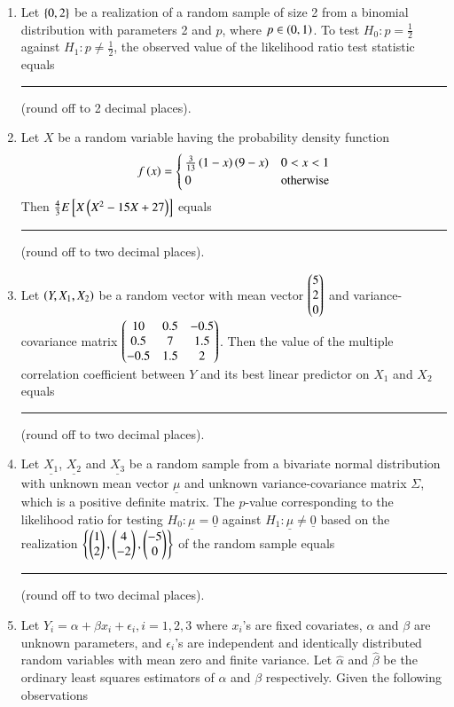 \documentclass[journal]{IEEEtran}
\begin{document}
\begin{enumerate}
    \item Let $\left\{0, 2\right\}$ be a realization of a random sample of size 2 from a binomial distribution
    with parameters 2 and $p$, where $p \in \left(0, 1\right)$. To test $H_0: p = \frac{1}{2}$ against
    $H_1: p \ne \frac{1}{2}$, the observed value of the likelihood ratio test statistic equals
    \rule{1.0cm}{0.15mm} (round off to 2 decimal places).

    \item Let $X$ be a random variable having the probability density function
    \begin{align*}
        f\left(x\right) = 
        \begin{cases}
            \frac{3}{13}\left(1-x\right)\left(9-x\right) & 0 < x < 1 \\
            0 & \text{otherwise}
        \end{cases}
    \end{align*}
    Then $\frac{4}{3}E{}\left[X\left(X^2 - 15X + 27\right)\right]$ equals \rule{1.0cm}{0.15mm}
    (round off to two decimal places).

    \item Let $\left(Y, X_1, X_2\right)$ be a random vector with mean vector $\begin{pmatrix}5 \\ 2 \\ 0\end{pmatrix}$ and
    variance-covariance matrix $\begin{pmatrix}10 & 0.5 & -0.5 \\ 0.5 & 7 & 1.5 \\ -0.5 & 1.5 & 2\end{pmatrix}$.
    Then the value of the multiple correlation coefficient between $Y$ and its best linear predictor on $X_1$
    and $X_2$ equals \rule{1.0cm}{0.15mm} (round off to two decimal places).

    \item Let $\underline{X_1}$, $\underline{X_2}$ and $\underline{X_3}$ be a random sample from a bivariate
    normal distribution with unknown mean vector $\underline{\mu}$ and unknown variance-covariance matrix
    $\Sigma$, which is a positive definite matrix. The $p$-value corresponding to the likelihood ratio for testing
    $H_0: \underline{\mu} = \underline{0}$ against $H_1: \underline{\mu} \ne \underline{0}$ based on the realization
    $\left\{\begin{pmatrix}1 \\ 2\end{pmatrix}, \begin{pmatrix}4 \\ -2\end{pmatrix}, \begin{pmatrix}-5 \\ 0\end{pmatrix}\right\}$ of the random sample equals \rule{1.0cm}{0.15mm}
    (round off to two decimal places).

    \item Let $Y_i = \alpha + \beta x_i + \epsilon_i, i=1,2,3$ where $x_i$'s are fixed covariates,
    $\alpha$ and $\beta$ are unknown parameters, and $\epsilon_i$'s are independent and identically
    distributed random variables with mean zero and finite variance. Let $\hat \alpha$ and
    $\hat \beta$ be the ordinary least squares estimators of $\alpha$ and $\beta$ respectively. Given
    the following observations
    

\end{enumerate}
\end{document}
